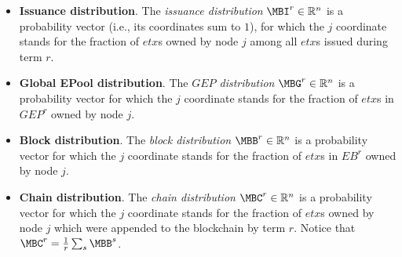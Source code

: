 \begin{itemize}
	\item \textbf{Issuance distribution}. The \textit{issuance distribution} $\MBI^r\in \mathbb{R}^n$ is a probability vector (i.e., its coordinates sum to $1$), for which the $j$ coordinate stands for the fraction of $etx$s owned by node $j$ among all $etx$s issued during term $r$. 
    \item \textbf{Global EPool distribution}. The \textit{$GEP$ distribution} $\MBG^r\in \mathbb{R}^n$ is a probability vector for which the $j$ coordinate stands for the fraction of $etx$s in $GEP^r$ owned by node $j$.  
     \item \textbf{Block distribution}. The \textit{block distribution} $\MBB^r\in \mathbb{R}^n$ is a probability vector for which the $j$ coordinate stands for the fraction of $etx$s in $EB^r$ owned by node $j$.
    \item \textbf{Chain distribution}. The \textit{chain distribution} $\MBC^r\in \mathbb{R}^n$ is a probability vector for which the $j$ coordinate stands for the fraction of $etx$s owned by node $j$ which were appended to the blockchain by term $r$. Notice that $\MBC^r=\frac{1}{r}\sum_s \MBB^s$.
\end{itemize}


